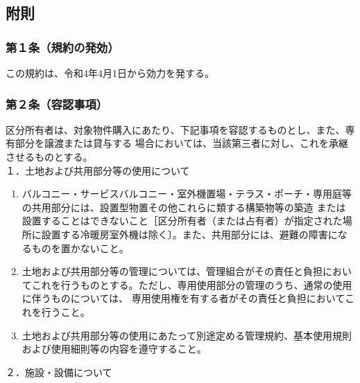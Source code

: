 \documentclass[
  luatex,
  paper=a4paper,
  fontsize=11pt,
  jafontsize=10pt,
  jlreq_notes,
]{jlreq}
\begin{document}
  \begin{center}
  \subsection*{附則}
  \end{center}
  \subsubsection*{第１条（規約の発効）}
  この規約は、令和4年4月1日から効力を発する。
  \subsubsection*{第２条（容認事項）}
  区分所有者は、対象物件購入にあたり、下記事項を容認するものとし、また、専有部分を譲渡または貸与する
  場合においては、当該第三者に対し、これを承継させるものとする。\\
  １．土地および共用部分等の使用について
  \begin{enumerate}
  \item バルコニー・サービスバルコニー・室外機置場・テラス・ポーチ・専用庭等の共用部分には、設置型物置その他これらに類する構築物等の築造
  または設置することはできないこと［区分所有者（または占有者）が指定された場所に設置する冷暖房室外機は除く〕。また、共用部分には、避難の障害になるものを置かないこと。
  \item 土地および共用部分等の管理については、管理組合がその責任と負担においてこれを行うものとする。ただし、専用使用部分の管理のうち、通常の使用に伴うものについては、
        専用使用権を有する者がその責任と負担においてこれを行うこと。
  \item 土地および共用部分等の使用にあたって別途定める管理規約、基本使用規則および使用細則等の内容を遵守すること。
  \end{enumerate}
  ２．施設・設備について
\end{document}
